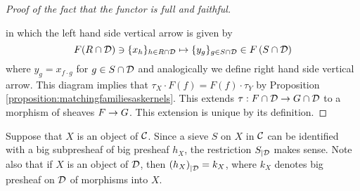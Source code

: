 \begin{proof}[Proof of the fact that the functor is full and faithful]
\begin{center}
\end{center}
in which the left hand side vertical arrow is given by
$$F(R\cap {\mathcal D})\ni \{x_h\}_{h\in R\cap {\mathcal D}}\mapsto \{y_g\}_{g\in S\cap {\mathcal D}} \in F\left(S\cap {\mathcal D}\right)$$
where $y_g = x_{f\cdot g}$ for $g\in S\cap {\mathcal D}$ and analogically we define right hand side vertical arrow. This diagram implies that $\tau_X\cdot F(f) = F(f)\cdot \tau_Y$ by Proposition \ref{proposition:matchingfamiliesaskernels}. This extends $\tau:F\cap {\mathcal D}\rightarrow G\cap {\mathcal D}$ to a morphism of sheaves $F\rightarrow G$. This extension is unique by its definition.
\end{proof}
\noindent
Suppose that $X$ is an object of ${\mathcal C}$. Since a sieve $S$ on $X$ in ${\mathcal C}$ can be identified with a big subpresheaf of big presheaf $h_X$, the restriction $S_{\mid {\mathcal D}}$ makes sense. Note also that if $X$ is an object of ${\mathcal D}$, then $\left(h_X\right)_{\mid {\mathcal D}} = k_X$, where $k_X$ denotes big presheaf on ${\mathcal D}$ of morphisms into $X$. 

